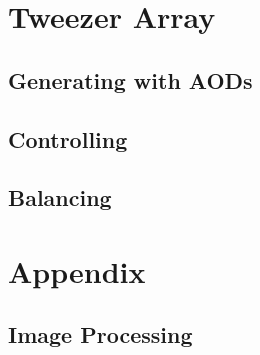 

 



\section{Tweezer Array}

\subsection{Generating with AODs}


\subsection{Controlling}


\subsection{Balancing}




% 



\section{Appendix}

\subsection{Image Processing}
